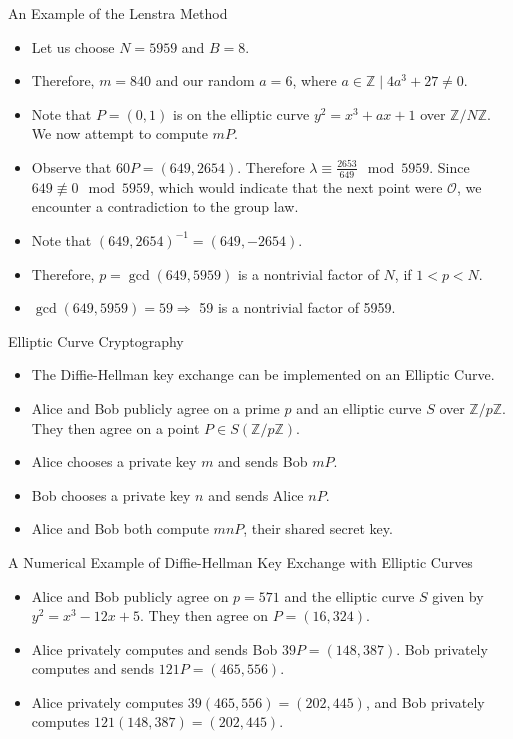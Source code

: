 \documentclass{beamer}
\begin{document}
	\begin{frame}{An Example of the Lenstra Method}
		\begin{itemize}
			\item Let us choose $N=5959$ and $B=8$.
			\item Therefore, $m=840$ and our random $a=6$, where $a \in \mathbb{Z} \mid 4a^3+27 \neq 0$.
			\item Note that $P=(0,1)$ is on the elliptic curve $y^2=x^3+ax+1$ over $\mathbb{Z}/N\mathbb{Z}$. We now attempt to compute $mP$.
			\item Observe that $60P=(649,2654)$. Therefore $\lambda\equiv\frac{2653}{649} \mod 5959$. Since $649 \not\equiv 0 \mod 5959$, which would indicate that the next point were $\mathcal{O}$, we encounter a contradiction to the group law.
			\item Note that $(649,2654)^{-1}=(649,-2654)$.
			\item Therefore, $p=\gcd(649,5959)$ is a nontrivial factor of $N$, if $1<p<N$.
			\item $\gcd(649,5959)=59\Longrightarrow$ 59 is a nontrivial factor of 5959.
		\end{itemize}
	\end{frame}
	
	\begin{frame}{Elliptic Curve Cryptography}
		\begin{itemize}
			\item The Diffie-Hellman key exchange can be implemented on an Elliptic Curve.
			\item Alice and Bob publicly agree on a prime $p$ and an elliptic curve $S$ over $\mathbb{Z}/p\mathbb{Z}$. They then agree on a point $P \in S(\mathbb{Z}/p\mathbb{Z})$.
			\item Alice chooses a private key $m$ and sends Bob $mP$.
			\item Bob chooses a private key $n$ and sends Alice $nP$.
			\item Alice and Bob both compute $mnP$, their shared secret key.
		\end{itemize}
	\end{frame}
	
	\begin{frame}{A Numerical Example of Diffie-Hellman Key Exchange with Elliptic Curves}
		\begin{itemize}
			\item Alice and Bob publicly agree on $p=571$ and the elliptic curve $S$ given by $y^2=x^3-12x+5$. They then agree on $P=(16,324)$.
			\item Alice privately computes and sends Bob $39P=(148,387)$. Bob privately computes and sends $121P=(465,556)$.
			\item Alice privately computes $39(465,556)=(202,445)$, and Bob privately computes $121(148,387)=(202,445)$.
		\end{itemize}
	\end{frame}
	
\end{document}
